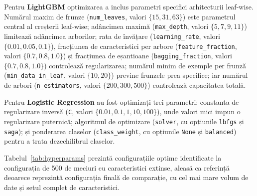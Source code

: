 Pentru \textbf{LightGBM} optimizarea a inclus parametri specifici
arhitecturii leaf-wise. Numărul maxim de frunze (\texttt{num\_leaves},
valori $\{15, 31, 63\}$) este parametrul central al creșterii leaf-wise;
adâncimea maximă (\texttt{max\_depth}, valori $\{5, 7, 9, 11\}$) limitează
adâncimea arborilor; rata de învățare (\texttt{learning\_rate}, valori
$\{0.01, 0.05, 0.1\}$), fracțiunea de caracteristici per arbore
(\texttt{feature\_fraction}, valori $\{0.7, 0.8, 1.0\}$) și fracțiunea de
eșantioane (\texttt{bagging\_fraction}, valori $\{0.7, 0.8, 1.0\}$)
controlează regularizarea; numărul minim de exemple per frunză
(\texttt{min\_data\_in\_leaf}, valori $\{10, 20\}$) previne frunzele prea
specifice; iar numărul de arbori (\texttt{n\_estimators}, valori
$\{200, 300, 500\}$) controlează capacitatea totală.

Pentru \textbf{Logistic Regression} au fost optimizați trei parametri:
constanta de regularizare inversă (\texttt{C}, valori
$\{0.01, 0.1, 1, 10, 100\}$), unde valori mici impun o regularizare
puternică; algoritmul de optimizare (\texttt{solver}, cu opțiunile
\texttt{lbfgs} și \texttt{saga}); și ponderarea claselor
(\texttt{class\_weight}, cu opțiunile \texttt{None} și \texttt{balanced})
pentru a trata dezechilibrul claselor.

Tabelul~\ref{tab:hyperparams} prezintă configurațiile optime identificate
la configurația de 500 de meciuri cu caracteristici extinse, aleasă ca
referință deoarece reprezintă configurația finală de comparație, cu cel mai
mare volum de date și setul complet de caracteristici.

